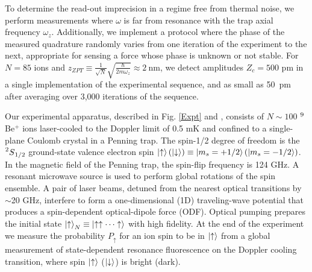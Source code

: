 \documentclass[aps,prl,twocolumn,superscriptaddress,floatfix]{revtex4-1}
\begin{document}
To determine the read-out imprecision in a regime free from thermal noise, we perform measurements where $\omega$ is far from resonance with the trap axial frequency $\omega_z$. Additionally, we implement a protocol where the phase of the measured quadrature randomly varies from one iteration of the experiment to the next, appropriate for sensing a force whose phase is unknown or not stable. For $N = 85$ ions and $z_{ZPT} \equiv \frac{1}{\sqrt{N}}\sqrt{\frac{\hbar}{2m\omega_z}} \approx 2\:\mathrm{nm}$, we detect amplitudes $Z_c=500$ pm in a single implementation of the experimental sequence, and as small as 50~pm after averaging over 3,000 iterations of the sequence.

Our experimental apparatus, described in Fig. \ref{Expt} and \citep{Bollinger2013,Sawyer2014,Bohnet2015}, consists of $N\sim100$ $\prescript{9}{}{}$Be$^{+}$ ions laser-cooled to the Doppler limit of 0.5 mK and confined to a single-plane Coulomb crystal in a Penning trap. The spin-1/2 degree of freedom is the $\prescript{2}{}{S}_{1/2}$ ground-state valence electron spin $\ket{\uparrow} (\ket{\downarrow}) \equiv \ket{m_{s}=+1/2} (\ket{m_{s}=-1/2}) $. In the magnetic field of the Penning trap, the spin-flip frequency is 124 GHz. A resonant microwave source is used to perform global rotations of the spin ensemble. A pair of laser beams, detuned from the nearest optical transitions by $\sim$20 GHz, interfere to form a one-dimensional (1D) traveling-wave potential that produces a spin-dependent optical-dipole force (ODF). Optical pumping prepares the initial state $\ket{\uparrow}_N \equiv \ket{\uparrow \uparrow \cdots \uparrow}$ with high fidelity. At the end of the experiment we measure the probability $P_\uparrow$ for an ion spin to be in $\ket{\uparrow}$ from a global measurement of state-dependent resonance fluorescence on the Doppler cooling transition, where spin $\ket{\uparrow}$ ($\ket{\downarrow}$) is bright (dark).
\end{document}
